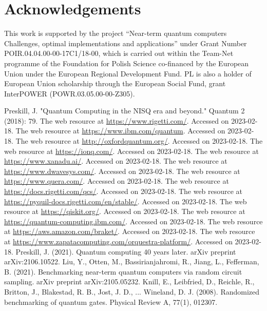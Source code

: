 \documentclass[preprint,12pt, a4paper, dvipsnames]{elsarticle}
\newcommand{\1}{{\rm 1\hspace{-0.9mm}l}}
\theoremstyle{definition}
\begin{document}
\section*{Acknowledgements}

This work is  supported by
the project “Near-term quantum computers Challenges, optimal implementations and applications” under Grant Number POIR.04.04.00-00-17C1/18-00, which is carried out within the Team-Net programme of the Foundation for Polish Science co-financed by the European Union under the European Regional Development Fund.
PL is also a holder of European Union scholarship through the European Social Fund,
grant InterPOWER (POWR.03.05.00-00-Z305).


\begin{thebibliography}{00}
 Preskill, J. "Quantum Computing in the NISQ era and beyond." Quantum 2 (2018): 79.
 The web resource at \url{https://www.rigetti.com/}. Accessed on 2023-02-18.
 The web resource at \url{https://www.ibm.com/quantum}. Accessed on 2023-02-18.
 The web resource at \url{http://oxfordquantum.org/}. Accessed on 2023-02-18.
 The web resource at \url{https://ionq.com/}. Accessed on 2023-02-18.
 The web resource at \url{https://www.xanadu.ai/}. Accessed on 2023-02-18.
 The web resource at \url{https://www.dwavesys.com/}. Accessed on 2023-02-18.
 The web resource at \url{https://www.quera.com/}. Accessed on 2023-02-18.
 The web resource at \url{https://docs.rigetti.com/qcs/}. Accessed on 2023-02-18.
 The web resource at \url{https://pyquil-docs.rigetti.com/en/stable/}. Accessed on 2023-02-18.
 The web resource at \url{https://qiskit.org/}. Accessed on 2023-02-18.
 The web resource at \url{https://quantum-computing.ibm.com/}. Accessed on 2023-02-18.
 The web resource at \url{https://aws.amazon.com/braket/}. Accessed on 2023-02-18.
 The web resource at \url{https://www.zapatacomputing.com/orquestra-platform/}. Accessed on 2023-02-18.
 Preskill, J. (2021). Quantum computing 40 years later. arXiv preprint arXiv:2106.10522.
 	Liu, Y., Otten, M., Bassirianjahromi, R., Jiang, L.,  Fefferman, B. (2021). Benchmarking near-term quantum computers via random circuit sampling. arXiv preprint arXiv:2105.05232.
 Knill, E., Leibfried, D., Reichle, R., Britton, J., Blakestad, R. B., Jost, J. D., ... Wineland, D. J. (2008). Randomized benchmarking of quantum gates. Physical Review A, 77(1), 012307.

\end{thebibliography}
\end{document}
